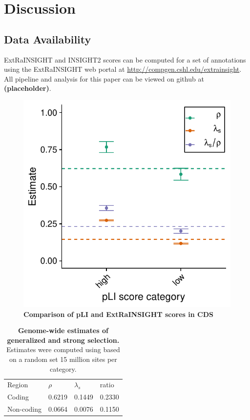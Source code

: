 \documentclass[11pt]{article}
\newcommand{\placeholder}{\textbf{(placeholder)}}
\begin{document}
\section*{Discussion}

\subsection*{Data Availability}

ExtRaINSIGHT and INSIGHT2 scores can be computed for a set of annotations using the ExtRaINSIGHT web portal at \url{http://compgen.cshl.edu/extrainsight}. All pipeline and analysis for this paper can be viewed on github at \placeholder.




\begin{figure}[t]
    \centering
    \includegraphics[width=0.5\linewidth]{figures/pLI_ratio.pdf}
    \caption{\textbf{Comparison of pLI and ExtRaINSIGHT scores in CDS}}
    \label{fig:pli}
\end{figure}

\begin{table}[t]
    \centering
	\begin{tabular}{@{}llll@{}}
		Region     & $\rho$ & $\lambda_s$ & ratio  \\ %
		Coding     & 0.6219 & 0.1449     & 0.2330 \\
		Non-coding & 0.0664 & 0.0076     & 0.1150 \\ %
	\end{tabular}
	\caption{\textbf{Genome-wide estimates of generalized and strong selection.} Estimates were computed using  based on a random set 15 million sites per category. }
	\label{tab:genome_wide_scores}
\end{table}
\end{document}

